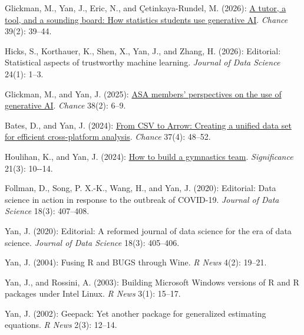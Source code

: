 \begin{CVMagazineArticles}

\item Glickman, M., Yan, J., Eric, N., and \c{C}etinkaya-Rundel, M. (2026):
\href{https://doi.org/10.1080/09332480.2026.2698398}{A tutor, a tool,
and a sounding board: How statistics students use generative AI}.
\emph{Chance} 39(2): 39--44.

\item Hicks, S., Korthauer, K., Shen, X., Yan, J., and Zhang, H. (2026):
Editorial: Statistical aspects of trustworthy machine learning.
\emph{Journal of Data Science} 24(1): 1--3.

\item Glickman, M., and Yan, J. (2025):
\href{https://doi.org/10.1080/09332480.2025.2510152}{ASA members'
perspectives on the use of generative AI}. \emph{Chance} 38(2): 6--9.

\item Bates, D., and Yan, J. (2024):
\href{https://doi.org/10.1080/09332480.2024.2434443}{From CSV to Arrow:
Creating a unified data set for efficient cross-platform analysis}.
\emph{Chance} 37(4): 48--52.

\item *Houlihan, K., and Yan, J. (2024):
\href{https://doi.org/10.1093/jrssig/qmae039}{How to build a gymnastics
team}. \emph{Significance} 21(3): 10-\/-14.

\item Follman, D., Song, P. X.-K., Wang, H., and Yan, J. (2020): Editorial:
Data science in action in response to the outbreak of COVID-19.
\emph{Journal of Data Science} 18(3): 407--408.

\item Yan, J. (2020): Editorial: A reformed journal of data science for the
era of data science. \emph{Journal of Data Science} 18(3): 405--406.

\item Yan, J. (2004): Fusing R and BUGS through Wine. \emph{R News} 4(2):
19--21.

\item Yan, J., and Rossini, A. (2003): Building Microsoft Windows versions of
R and R packages under Intel Linux. \emph{R News} 3(1): 15--17.

\item Yan, J. (2002): Geepack: Yet another package for generalized estimating
equations. \emph{R News} 2(3): 12--14.

\end{CVMagazineArticles}

